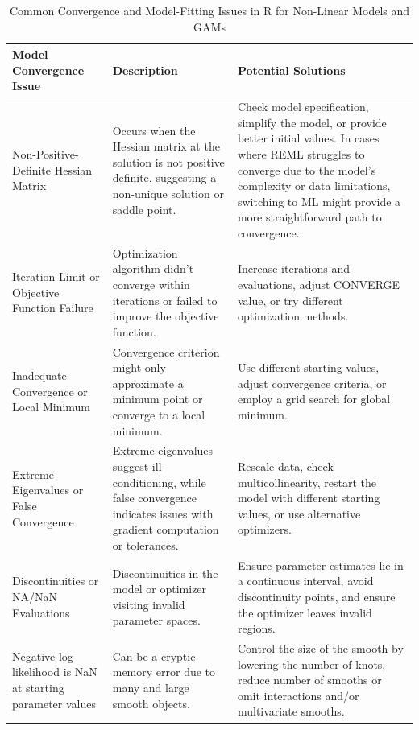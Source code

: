 \documentclass[12pt, twoside,hidelinks]{article}
\theoremstyle{definition}
\numberwithin{equation}{section}
\begin{document}
\begin{table}[H]
\centering
\begin{tabular}{>{\raggedright}p{4.5cm} >{\raggedright}p{6cm} >{\raggedright\arraybackslash}p{5.5cm}}
\toprule
\textbf{Model Convergence Issue} & \textbf{Description} & \textbf{Potential Solutions} \\
\midrule
Non-Positive-Definite Hessian Matrix & Occurs when the Hessian matrix at the solution is not positive definite, suggesting a non-unique solution or saddle point. & Check model specification, simplify the model, or provide better initial values. In cases where REML struggles to converge due to the model's complexity or data limitations, switching to ML might provide a more straightforward path to convergence. \\
\addlinespace
Iteration Limit or Objective Function Failure & Optimization algorithm didn't converge within iterations or failed to improve the objective function. & Increase iterations and evaluations, adjust CONVERGE value, or try different optimization methods. \\
\addlinespace
Inadequate Convergence or Local Minimum & Convergence criterion might only approximate a minimum point or converge to a local minimum. & Use different starting values, adjust convergence criteria, or employ a grid search for global minimum. \\
\addlinespace
Extreme Eigenvalues or False Convergence & Extreme eigenvalues suggest ill-conditioning, while false convergence indicates issues with gradient computation or tolerances. & Rescale data, check multicollinearity, restart the model with different starting values, or use alternative optimizers. \\
\addlinespace
Discontinuities or NA/NaN Evaluations & Discontinuities in the model or optimizer visiting invalid parameter spaces. & Ensure parameter estimates lie in a continuous interval, avoid discontinuity points, and ensure the optimizer leaves invalid regions. \\
\addlinespace
Negative log-likelihood is NaN at starting parameter values & Can be a cryptic memory error due to many and large smooth objects. & Control the size of the smooth by lowering the number of knots, reduce number of smooths or omit interactions and/or multivariate smooths. \\
\bottomrule
\end{tabular}
\caption{Common Convergence and Model-Fitting Issues in R for Non-Linear Models and GAMs}
\label{tab:model_convergence_combined}
\end{table}
\newpage
\end{document}

